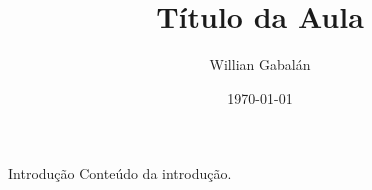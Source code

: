 \documentclass{beamer}
\title{Título da Aula}
\author{Willian Gabalán}
\date{\today}
\begin{document}
\frame{\titlepage}

\begin{frame}{Introdução}
Conteúdo da introdução.
\end{frame}
\end{document}
